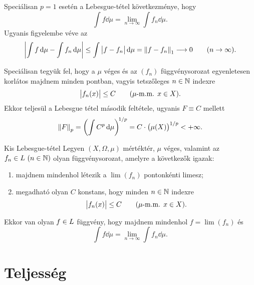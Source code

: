 \documentclass[
]{elteikthesis}[2024/04/26]
\begin{document}
	\begin{notes}
		\item Speciálisan \( p = 1 \) esetén a Lebesgue-tétel következménye, hogy
		\[
			\int f \dd{\mu} = \lim_{n \to \infty} \int f_n \dd{\mu}.
		\]
		Ugyanis figyelembe véve az
		\[
			\abs\bigg{ \int f \mathop{}\!\mathrm{d}{\mu} - \int f_n \mathop{}\!\mathrm{d}{\mu} } \leq
			\int \abs\big{ f - f_n } \mathop{}\!\mathrm{d}{\mu} =
			\norm{ f - f_n }_1 \longrightarrow 0 
			\qquad (n \to \infty).
		\]
		
		\item
		Speciálisan tegyük fel, hogy a \( \mu \) véges és az \( (f_n) \) függvénysorozat egyenletesen korlátos majdnem minden pontban, vagyis tetszőleges \( n \in \mathbb{N} \) indexre
		\[
			\abs\big{f_n(x)} \leq C \qquad (\mu \text{-m.m. } x \in X).
		\]
		Ekkor teljesül a Lebesgue tétel második feltétele, ugyanis \( F \equiv C \) mellett
		\[
			\norm{F}_p = 
			\biggl( \int C^p \mathop{}\!\mathrm{d}{\mu} \biggr)^{\! 1/p} =
			C \cdot \bigl( \mu( X ) \bigr)^{1/p} < 
			+\infty.
		\]
	\end{notes}
	
	\begin{theorem}{Kis Lebesgue-tétel}{}
		Legyen \( (X, \Omega, \mu) \) mértéktér, \( \mu \) véges, 
		valamint az \( f_n \in \Lebesgue \ (n \in \N) \) olyan függvénysorozat, 
		amelyre a következők igazak:
		\begin{enumerate}[label=\roman*)]
			\item
			majdnem mindenhol létezik a \( \lim(f_n) \) pontonkénti limesz;
			
			\item
			megadható olyan \( C \) konstans, hogy minden \( n \in \mathbb{N} \) indexre
			\[
				\abs\big{f_n(x)} \leq C \qquad (\mu \text{-m.m. } x \in X).
			\]
		\end{enumerate}
		Ekkor van olyan \( f \in \Lebesgue \) függvény, 
		hogy majdnem mindenhol \( f = \lim(f_n) \) és
		\[
			\int f \dd{\mu} = \lim_{n \to \infty} \int f_n \dd{\mu}.
		\]
	\end{theorem}
	
	\newpage
	\section{Teljesség}
	
\end{document}
